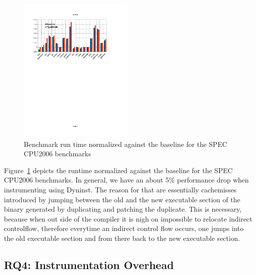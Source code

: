 \label{section:typeshieldoverheadperformance}
\begin{figure}[!h]
    \centering
    \includegraphics[width=0.49\textwidth]{figures/speccpu2006.pdf}
    \caption{Benchmark run time normalized against the baseline for the SPEC CPU2006 benchmarks}
    \label{fig:awesome_image}
\end{figure}
Figure~\ref{fig:awesome_image} depicts the runtime normalized against the baseline for 
the SPEC CPU2006 benchmarks.
In general, we have an about 5\% performance drop when instrumenting using Dyninst. 
The reason for that are essentially cachemisses introduced by jumping between the 
old and the new executable section of the binary generated by duplicating and patching 
the duplicate. This is necessary, because when out side of the compiler it is nigh on 
impossible to relocate indirect controlflow, therefore everytime an indirect control 
flow occurs, one jumps into the old executable section and from there back to the new 
executable section.


\subsection{RQ4: Instrumentation Overhead}
\label{section:typeshieldoverheadinstrumentation}


